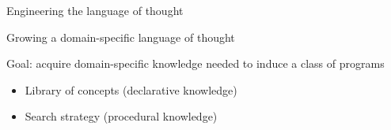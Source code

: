 \documentclass{beamer}
\begin{document}
\begin{frame}{Engineering the language of thought}
\end{frame}



\begin{frame}{Growing a domain-specific language of thought}
  
  Goal: acquire domain-specific knowledge needed to induce a class of programs


  
  \pause
  \vspace{1cm}

  \begin{itemize}
  \item Library of concepts (declarative knowledge)
    \item Search strategy (procedural knowledge)
    \end{itemize}
\end{frame}
\end{document}
